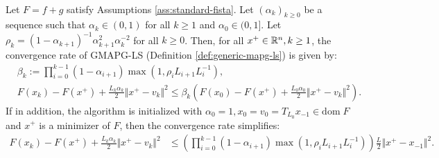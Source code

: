 \documentclass[12pt]{report}
\begin{document}
        \begin{theorem}\; \label{thm:gmapg-ls-convergence}\;\\
            Let $F = f + g$ satisfy Assumptions \ref{ass:standard-fista}. 
            Let $(\alpha_k)_{k \ge 0}$ be a sequence such that $\alpha_k \in (0, 1)$ for all $k \ge 1$ and $\alpha_0 \in (0, 1]$. 
            Let $\rho_k = (1 - \alpha_{k + 1})^{-1}\alpha_{k + 1}^2 \alpha_k^{-2}$ for all $k \ge 0$. 
            Then, for all $x^+ \in \mathbb R^n, k \ge 1$, the convergence rate of GMAPG-LS (Definition \ref{def:generic-mapg-ls}) is given by: 
            \begin{align*}
                & \beta_k := \prod_{i = 0}^{k - 1} (1 - \alpha_{i + 1})
                \max\left(1, \rho_i L_{i + 1}L_i^{-1}\right), 
                \\
                & F(x_k) - F(x^+) + \frac{L_k\alpha_k}{2}\Vert x^+ - v_k\Vert^2
                \le 
                \beta_k
                \left(
                    F(x_0) - F(x^+) + \frac{L_0\alpha_0}{2} \Vert x^+ - v_k\Vert^2
                \right). 
            \end{align*}
            If in addition, the algorithm is initialized with $\alpha_0 = 1, x_0 = v_0 = T_{L_{0}}x_{-1} \in \text{dom}\; F$ and $x^+$ is a minimizer of $F$, then the convergence rate simplifies: 
            \begin{align*}
                F(x_k) - F(x^+) + \frac{L_k\alpha_k}{2}\Vert x^+ - v_k\Vert^2
                & \le 
                \left(
                    \prod_{i = 0}^{k - 1} (1 - \alpha_{i + 1})
                    \max\left(1, \rho_i L_{i + 1}L_i^{-1}\right)
                \right)
                \frac{L}{2}\Vert x^+ - x_{-1}\Vert^2. 
            \end{align*}
        \end{theorem}
\end{document}
